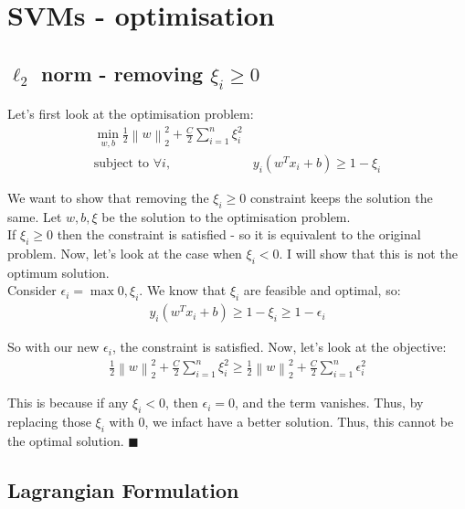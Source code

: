 \documentclass[a4paper]{article}
\newcommand{\norm}[1]{\left\lVert#1\right\rVert}
\begin{document}
\newpage

\section{SVMs - optimisation}

\subsection{$\ell_2$ norm - removing $\xi_i \geq 0$}

Let's first look at the optimisation problem:
\begin{align*}
    \min_{w, b} \frac{1}{2} \norm{w}_2^2 + \frac{C}{2} \sum_{i=1}^n \xi_i ^ 2&\\
    \text{subject to } \forall i, \ &y_i(w^T x_i + b) \geq 1 - \xi_i
\end{align*}

We want to show that removing the $\xi_i \geq 0$ constraint keeps the solution the same. Let $w, b, \xi$ be the solution to the optimisation problem.\\

If $\xi_i \geq 0$ then the constraint is satisfied - so it is equivalent to the original problem. Now, let's look at the case when $\xi_i < 0$. I will show that this is not the optimum solution.\\

Consider $\epsilon_i = \max{0, \xi_i}$. We know that $\xi_i$ are feasible and optimal, so:
\begin{align*}
    y_i(w^T x_i + b) \geq 1 - \xi_i \geq 1 - \epsilon_i
\end{align*}

So with our new $\epsilon_i$, the constraint is satisfied. Now, let's look at the objective:
\begin{align*}
    \frac{1}{2} \norm{w}_2^2 + \frac{C}{2} \sum_{i=1}^n \xi_i ^ 2 \geq \frac{1}{2} \norm{w}_2^2 + \frac{C}{2} \sum_{i=1}^n \epsilon_i ^ 2
\end{align*}

This is because if any $\xi_i < 0$, then $\epsilon_i = 0$, and the term vanishes. Thus, by replacing those $\xi_i$ with $0$, we infact have a better solution. Thus, this cannot be the optimal solution. $\blacksquare$\\

\subsection{Lagrangian Formulation}
\end{document}
